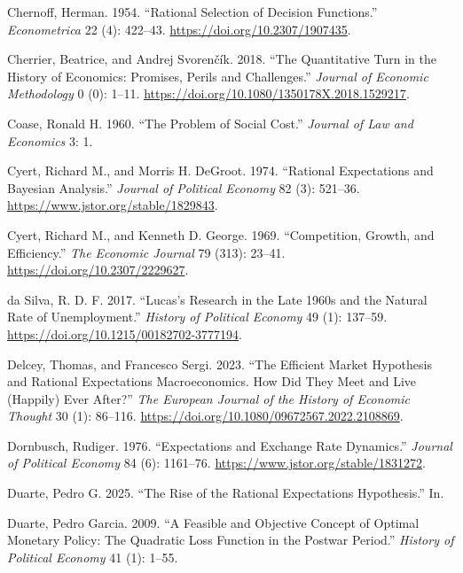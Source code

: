 \documentclass[
]{interact}
\newlength{\cslhangindent}
\newenvironment{CSLReferences}[2] %
 {\begin{list}{}{%
  \setlength{\itemindent}{0pt}
  \setlength{\leftmargin}{0pt}
  \setlength{\parsep}{0pt}
  \ifodd #1
   \setlength{\leftmargin}{\cslhangindent}
   \setlength{\itemindent}{-1\cslhangindent}
  \fi
  \setlength{\itemsep}{#2\baselineskip}}}
 {\end{list}}
\begin{document}
\begin{CSLReferences}{1}{0}
Chernoff, Herman. 1954. {``Rational {Selection} of {Decision
Functions}.''} \emph{Econometrica} 22 (4): 422--43.
\url{https://doi.org/10.2307/1907435}.

Cherrier, Beatrice, and Andrej Svorenčík. 2018. {``The Quantitative Turn
in the History of Economics: Promises, Perils and Challenges.''}
\emph{Journal of Economic Methodology} 0 (0): 1--11.
\url{https://doi.org/10.1080/1350178X.2018.1529217}.

Coase, Ronald H. 1960. {``The {Problem} of {Social Cost}.''}
\emph{Journal of Law and Economics} 3: 1.

Cyert, Richard M., and Morris H. DeGroot. 1974. {``Rational
{Expectations} and {Bayesian Analysis}.''} \emph{Journal of Political
Economy} 82 (3): 521--36. \url{https://www.jstor.org/stable/1829843}.

Cyert, Richard M., and Kenneth D. George. 1969. {``Competition,
{Growth}, and {Efficiency}.''} \emph{The Economic Journal} 79 (313):
23--41. \url{https://doi.org/10.2307/2229627}.

da Silva, R. D. F. 2017. {``Lucas's {Research} in the {Late} 1960s and
the {Natural Rate} of {Unemployment}.''} \emph{History of Political
Economy} 49 (1): 137--59.
\url{https://doi.org/10.1215/00182702-3777194}.

Delcey, Thomas, and Francesco Sergi. 2023. {``The Efficient Market
Hypothesis and Rational Expectations Macroeconomics. {How} Did They Meet
and Live (Happily) Ever After?''} \emph{The European Journal of the
History of Economic Thought} 30 (1): 86--116.
\url{https://doi.org/10.1080/09672567.2022.2108869}.

Dornbusch, Rudiger. 1976. {``Expectations and {Exchange Rate
Dynamics}.''} \emph{Journal of Political Economy} 84 (6): 1161--76.
\url{https://www.jstor.org/stable/1831272}.

Duarte, Pedro G. 2025. {``The {Rise} of the {Rational Expectations
Hypothesis}.''} In.

Duarte, Pedro Garcia. 2009. {``A {Feasible} and {Objective Concept} of
{Optimal Monetary Policy}: {The Quadratic Loss Function} in the {Postwar
Period}.''} \emph{History of Political Economy} 41 (1): 1--55.


\end{CSLReferences}
\end{document}

